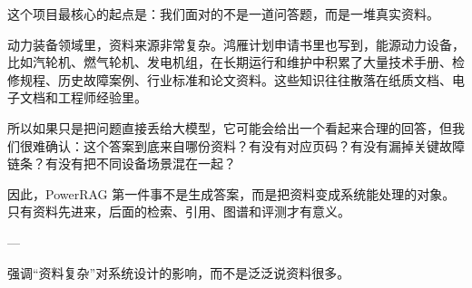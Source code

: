 \documentclass[10pt, a4paper]{ctexart}
\begin{document}
\begin{tcolorbox}[colback=white, colframe=primary!35, title={\textbf{第 4 页：我们面对的不是一道问答题}}, beforeafter skip=2.0pt]
\begin{minipage}[t]{0.72\textwidth}
  \linespread{1.0}\selectfont\footnotesize
  这个项目最核心的起点是：我们面对的不是一道问答题，而是一堆真实资料。

动力装备领域里，资料来源非常复杂。鸿雁计划申请书里也写到，能源动力设备，比如汽轮机、燃气轮机、发电机组，在长期运行和维护中积累了大量技术手册、检修规程、历史故障案例、行业标准和论文资料。这些知识往往散落在纸质文档、电子文档和工程师经验里。

所以如果只是把问题直接丢给大模型，它可能会给出一个看起来合理的回答，但我们很难确认：这个答案到底来自哪份资料？有没有对应页码？有没有漏掉关键故障链条？有没有把不同设备场景混在一起？

因此，PowerRAG 第一件事不是生成答案，而是把资料变成系统能处理的对象。只有资料先进来，后面的检索、引用、图谱和评测才有意义。

---
\end{minipage}
\hfill
\begin{minipage}[t]{0.25\textwidth}
  \fontsize{7.5}{9.5}\selectfont
  \begin{tcolorbox}[colback=orange!5, colframe=orange!45, title=\textbf{讲述重点}, left=0.6mm, right=0.6mm, top=0.8mm, bottom=0.8mm, arc=0.8mm, boxrule=0.4pt, beforeafter skip=0pt]
    强调“资料复杂”对系统设计的影响，而不是泛泛说资料很多。
  \end{tcolorbox}
\end{minipage}
\end{tcolorbox}
\end{document}
